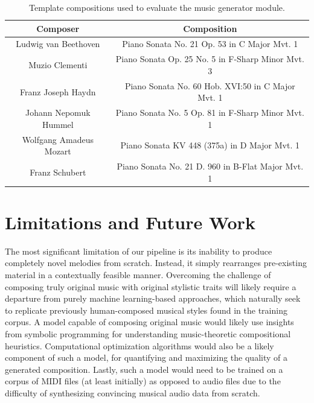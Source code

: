 \documentclass{article}
\begin{document}
\begin{table}
    \centering
    \begin{tabular}{cc}
        \toprule
        Composer & Composition \\
        \toprule
        Ludwig van Beethoven & Piano Sonata No. 21 Op. 53 in C Major Mvt. 1 \\
        \midrule
        Muzio Clementi & Piano Sonata Op. 25 No. 5 in F-Sharp Minor Mvt. 3 \\
        \midrule
        Franz Joseph Haydn & Piano Sonata No. 60 Hob. XVI:50 in C Major Mvt. 1 \\
        \midrule
        Johann Nepomuk Hummel & Piano Sonata No. 5 Op. 81 in F-Sharp Minor Mvt. 1 \\
        \midrule
        Wolfgang Amadeus Mozart & Piano Sonata KV 448 (375a) in D Major Mvt. 1 \\
        \midrule
        Franz Schubert & Piano Sonata No. 21 D. 960 in B-Flat Major Mvt. 1 \\
        \bottomrule
    \end{tabular}
    \caption{Template compositions used to evaluate the music generator module.}
    \label{tab:template_compositions}
\end{table}

\section{Limitations and Future Work}

The most significant limitation of our pipeline is its inability to produce completely novel melodies from scratch. Instead, it simply rearranges pre-existing material in a contextually feasible manner. Overcoming the challenge of composing truly original music with original stylistic traits will likely require a departure from purely machine learning-based approaches, which naturally seek to replicate previously human-composed musical styles found in the training corpus. A model capable of composing original music would likely use insights from symbolic programming for understanding music-theoretic compositional heuristics. Computational optimization algorithms would also be a likely component of such a model, for quantifying and maximizing the quality of a generated composition. Lastly, such a model would need to be trained on a corpus of MIDI files (at least initially) as opposed to audio files due to the difficulty of synthesizing convincing musical audio data from scratch.
\end{document}
